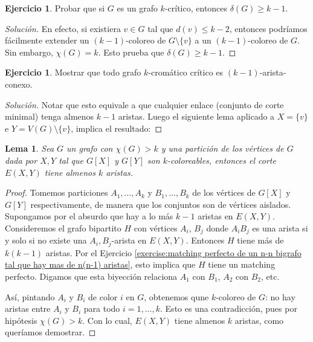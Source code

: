 \documentclass[12pt]{report}
\theoremstyle{plain}
\newtheorem{lemma}[theorem]{Lema}
\theoremstyle{definition}
\newtheorem{exercise}[theorem]{Ejercicio}
\newenvironment{solution}{\begin{proof}[Solución]}{\end{proof}}
\begin{document}
\begin{exercise}
Probar que si $G$ es un grafo $k$-crítico, entonces $\delta (G) \geq k-1$.
\end{exercise}
\begin{solution}
En efecto, si existiera $v \in G$ tal que $d (v) \leq k-2$, entonces podríamos fácilmente extender un $(k-1)$-coloreo de $G \setminus \{v\}$ a un $(k-1)$-coloreo de $G$. Sin embargo, $\chi (G) = k$. Esto prueba que $\delta (G) \geq k-1$.
\end{solution}

\begin{exercise}
Mostrar que todo grafo $k$-cromático crítico es $(k-1)$-arista-conexo.
\end{exercise}
\begin{solution}
Notar que esto equivale a que cualquier enlace (conjunto de corte minimal) tenga almenos $k-1$ aristas. Luego el siguiente lema aplicado a $X = \{v\}$ e $Y = V(G) \setminus \{v\}$, implica el resultado:
\end{solution}

\begin{lemma}
Sea $G$ un grafo con $\chi (G) > k$ y una partición de los vértices de $G$ dada por $X,Y$ tal que $G[X]$ y $G[Y]$ son $k$-coloreables, entonces el corte $E(X,Y)$ tiene almenos $k$ aristas.
\end{lemma}
\begin{proof}
Tomemos particiones $A_1, \ldots, A_k$ y $B_1, \ldots, B_k$ de los vértices de $G[X]$ y $G[Y]$ respectivamente, de manera que los conjuntos son de vértices aislados. Supongamos por el absurdo que hay a lo más $k-1$ aristas en $E(X,Y)$. Consideremos el grafo bipartito $H$ con vértices $A_i$, $B_j$ donde $A_i{B_j}$ es una arista si y solo si no existe una $A_i,B_j$-arista en $E(X,Y)$. Entonces $H$ tiene más de $k(k-1)$ aristas. Por el Ejercicio \ref{exercise:matching perfecto de un n-n bigrafo tal que hay mas de n(n-1) aristas}, esto implica que $H$ tiene un matching perfecto. Digamos que esta biyección relaciona $A_1$ con $B_1$, $A_2$ con $B_2$, etc.

Así, pintando $A_i$ y $B_i$ de color $i$ en $G$, obtenemos qune $k$-coloreo de $G$: no hay aristas entre $A_i$ y $B_i$ para todo $i =1, \ldots, k$. Esto es una contradicción, pues por hipótesis $\chi (G) > k$. Con lo cual, $E(X,Y)$ tiene almenos $k$ aristas, como queríamos demostrar.
\end{proof}
\end{document}
